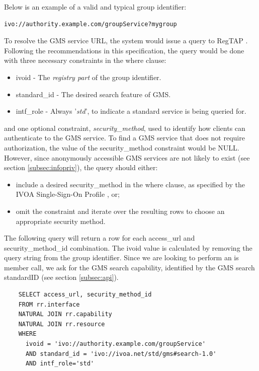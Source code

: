 \documentclass[11pt,a4paper]{ivoa}
\begin{document}
Below is an example of a valid and typical group identifier:

\begin{verbatim}
ivo://authority.example.com/groupService?mygroup
\end{verbatim}

To resolve the GMS service URL, the system would issue a query to RegTAP \citep{2014ivoa.spec.1208D}.  Following the recommendations in this specification, the query would be done with three necessary constraints in the where clause:
\begin{itemize}
\item{ivoid} - The \emph{registry part} of the group identifier.
\item{standard\_id} - The desired search feature of GMS.
\item{intf\_role} - Always '\emph{std}', to indicate a standard service is being queried for.
\end{itemize}

and one optional constraint, \emph{security\_method}, used to identify how clients can authenticate to the GMS service.  To find a GMS service that does not require authorization, the value of the security\_method constraint would be NULL.  However, since anonymously accessible GMS services are not likely to exist (see section \ref{subsec:infopriv}), the query should either:

\begin{itemize}
\item include a desired security\_method in the where clause, as specified by the IVOA Single-Sign-On Profile \citep{2017ivoa.spec.0524T}, or;
\item omit the constraint and iterate over the resulting rows to choose an appropriate security method.
\end{itemize}

The following query will return a row for each access\_url and security\_method\_id combination.  The ivoid value is calculated by removing the query string from the group identifier.  Since we are looking to perform an is member call, we ask for the GMS search capability, identified by the GMS search standardID (see section \ref{subsec:api}).

\begin{verbatim}
    SELECT access_url, security_method_id
    FROM rr.interface
    NATURAL JOIN rr.capability
    NATURAL JOIN rr.resource
    WHERE
      ivoid = 'ivo://authority.example.com/groupService' 
      AND standard_id = 'ivo://ivoa.net/std/gms#search-1.0'
      AND intf_role='std'
\end{verbatim}
\end{document}
